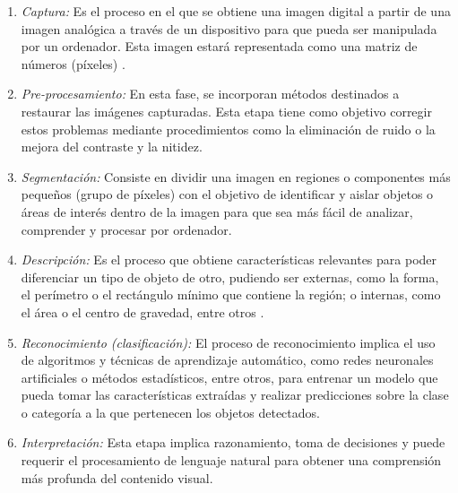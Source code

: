 \begin{enumerate}
 \item \textit{Captura:} %
Es el proceso en el que se obtiene una imagen digital a partir de una imagen analógica a través de un dispositivo para que pueda ser manipulada por un ordenador. Esta imagen estará representada como una matriz de números (píxeles) \cite{Martinez22}.
 
 \item \textit{Pre-procesamiento:} En esta fase, se incorporan métodos destinados a restaurar las imágenes capturadas.%
Esta etapa tiene como objetivo corregir estos problemas mediante procedimientos como la eliminación de ruido o la mejora del contraste y la nitidez.
 
 \item \textit{Segmentación:} %
Consiste en dividir una imagen en regiones o componentes más pequeños (grupo de píxeles) con el objetivo de identificar y aislar objetos o áreas de interés dentro de la imagen %
para que sea más fácil de analizar, comprender y procesar por ordenador.

 \item \textit{Descripción:} Es el proceso que obtiene características relevantes para poder diferenciar un tipo de objeto de otro, pudiendo ser externas, como la forma, el perímetro o el rectángulo mínimo que contiene la región; o internas, como el área o el centro de gravedad, entre otros \cite{Santillan15}. 
 
 \item \textit{Reconocimiento (clasificación):} %
El proceso de reconocimiento implica el uso de algoritmos y técnicas de aprendizaje automático, como redes neuronales artificiales o métodos estadísticos, entre otros, para entrenar un modelo que pueda tomar las características extraídas y realizar predicciones sobre la clase o categoría a la que pertenecen los objetos detectados.
 
 \item \textit{Interpretación:} %
Esta etapa implica razonamiento, toma de decisiones y puede requerir el procesamiento de lenguaje natural para obtener una comprensión más profunda del contenido visual.
 
\end{enumerate}

